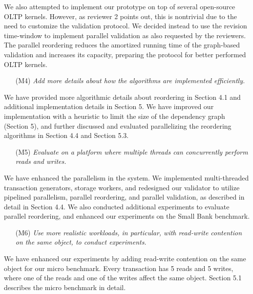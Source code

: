 \documentclass{article}
\begin{document}
We also attempted to implement our prototype on top of several open-source OLTP kernels. However, as reviewer 2 points out, this is nontrivial due to the need to customize the validation protocol. We decided instead to use the revision time-window to implement parallel validation as also requested by the reviewers. The parallel reordering reduces the amortized running time of the graph-based validation and increases its capacity, preparing the protocol for better performed OLTP kernels.

\begin{itemize}
\item[(M4)]  \emph{Add more details about how the algorithms are implemented efficiently.}
\end{itemize}
\vspace{-1em}
We have provided more algorithmic details about reordering in Section 4.1 and additional implementation details in Section 5. We have improved our implementation with a heuristic to limit the size of the dependency graph (Section 5), and further discussed and evaluated parallelizing the reordering algorithms in Section 4.4 and Section 5.3. 

\begin{itemize}
\item[(M5)]  \emph{Evaluate on a platform where multiple threads can concurrently perform reads and writes.}
\end{itemize}
\vspace{-1em}
We have enhanced the parallelism in the system. We implemented multi-threaded transaction generators, storage workers, and redesigned our validator to utilize pipelined parallelism, parallel reordering, and parallel validation, as described in detail in Section 4.4. We also conducted additional experiments to evaluate parallel reordering, and enhanced our experiments on the Small Bank benchmark.

\begin{itemize}
\item[(M6)] \emph{Use more realistic workloads, in particular, with read-write contention on the same object, to conduct experiments.}
\end{itemize}
\vspace{-1em}
We have enhanced our experiments by adding read-write contention on the same object for our micro benchmark. Every transaction has 5 reads and 5 writes, where one of the reads and one of the writes affect the same object. Section 5.1 describes the micro benchmark in detail.
\end{document}
